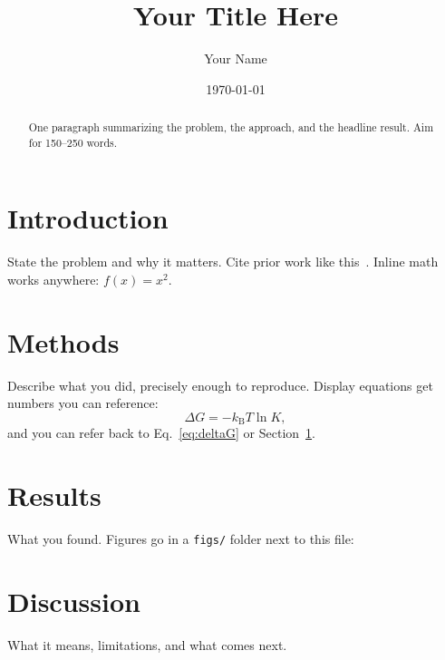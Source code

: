 \documentclass[11pt]{article}
\title{Your Title Here}
\author{Your Name}
\date{\today}
\begin{document}
\maketitle

\begin{abstract}
One paragraph summarizing the problem, the approach, and the headline result.
Aim for 150--250 words.
\end{abstract}

\section{Introduction}
\label{sec:intro}
State the problem and why it matters. Cite prior work like
this~\citep{example2024}. Inline math works anywhere: $f(x) = x^2$.

\section{Methods}
\label{sec:methods}
Describe what you did, precisely enough to reproduce. Display equations get
numbers you can reference:
\begin{equation}
  \Delta G = -k_\mathrm{B} T \ln K,
  \label{eq:deltaG}
\end{equation}
and you can refer back to Eq.~\eqref{eq:deltaG} or Section~\ref{sec:intro}.

\section{Results}
\label{sec:results}
What you found. Figures go in a \texttt{figs/} folder next to this file:

\section{Discussion}
\label{sec:discussion}
What it means, limitations, and what comes next.



\end{document}
